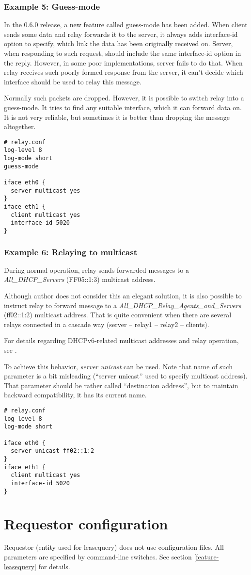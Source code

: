 \subsubsection{Example 5: Guess-mode}
In the 0.6.0 release, a new feature called guess-mode has been
added. When client sends some data and relay forwards it to the
server, it always adds interface-id option to specify, which link
the data has been originally received on. Server, when responding to
such request, should include the same interface-id option in the
reply. However, in some poor implementations, server fails to do
that. When relay receives such poorly formed response from the server,
it can't decide which interface should be used to relay this
message.

Normally such packets are dropped. However, it is possible to switch
relay into a guess-mode. It tries to find any suitable interface,
which it can forward data on. It is not very reliable, but sometimes
it is better than dropping the message altogether.

\begin{lstlisting}
# relay.conf
log-level 8
log-mode short
guess-mode

iface eth0 {
  server multicast yes
}
iface eth1 {
  client multicast yes
  interface-id 5020
}
\end{lstlisting}

\subsubsection{Example 6: Relaying to multicast}
During normal operation, relay sends forwarded messages to a
\emph{All\_DHCP\_Servers} (FF05::1:3) multicast address.

Although author does not consider this an elegant solution, it is also
possible to instruct relay to forward message to a \emph{All\_DHCP\_Relay\_Agents\_and\_Servers}
(ff02::1:2) multicast address. That is quite convenient when there are several
relays connected in a cascade way (server -- relay1 -- relay2 -- clients).

For details regarding DHCPv6-related multicast addresses and relay operation, see \cite{rfc3315}.

To achieve this behavior, \emph{server unicast} can be used. Note that
name of such parameter is a bit misleading (``server unicast'' used to specify
multicast address). That parameter should be rather called ``destination address'',
but to maintain backward compatibility, it has its current name.

\begin{lstlisting}
# relay.conf
log-level 8
log-mode short

iface eth0 {
  server unicast ff02::1:2
}
iface eth1 {
  client multicast yes
  interface-id 5020
}
\end{lstlisting}

\newpage
\section{Requestor configuration}
Requestor (entity used for leasequery) does not use configuration
files. All parameters are specified by command-line switches. See
section \ref{feature-leasequery} for details.
